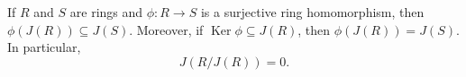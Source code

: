 If $R$ and $S$ are rings and $\phi: R \to S$ is a surjective ring homomorphism, then $\phi(J(R)) \subseteq J(S)$. Moreover, if $\operatorname{Ker} \phi \subseteq J(R)$, then $\phi(J(R)) = J(S)$. In particular,
$$J(R/J(R)) = 0.$$
